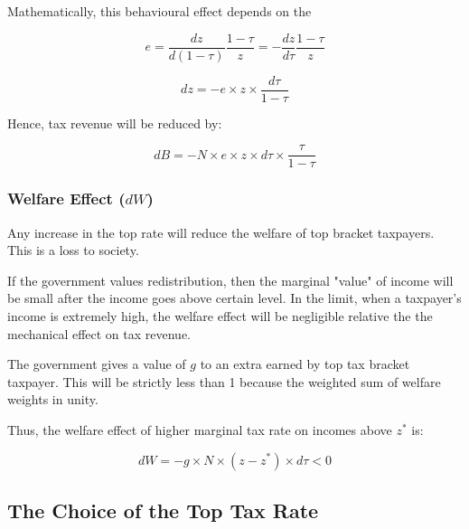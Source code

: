             Mathematically, this behavioural effect depends on the 

            \begin{equation*}
                e = \frac{d z}{d (1-\tau)} \frac{1-\tau}{z} = -\frac{d z}{d \tau} \frac{1-\tau}{z}
            \end{equation*}
            
            \begin{equation*}
                dz = -e \times z \times \frac{d\tau}{1-\tau}
            \end{equation*}

            Hence, tax revenue will be reduced by:

            \begin{equation}
                dB = - N \times e \times z \times d\tau \times \frac{\tau}{1-\tau}
                \label{eqn:tax_top_BR}
            \end{equation}

        \subsubsection{Welfare Effect ($dW$)}

            Any increase in the top rate will reduce the welfare of top bracket taxpayers. This is a loss to society.

            If the government values redistribution, then the marginal "value" of income will be small after the income goes above certain level. In the limit, when a taxpayer's income is extremely high, the welfare effect will be negligible relative the the mechanical effect on tax revenue.

            The government gives a value of $g$ to an extra  earned by top tax bracket taxpayer. This will be strictly less than 1 because the weighted sum of welfare weights in unity.

            Thus, the welfare effect of higher marginal tax rate on incomes above $z^*$ is:

            \begin{equation}
                dW = -g \times N \times (z-z^*) \times d\tau < 0
                \label{eqn:tax_top_WE}
            \end{equation}

    \subsection{The Choice of the Top Tax Rate}

